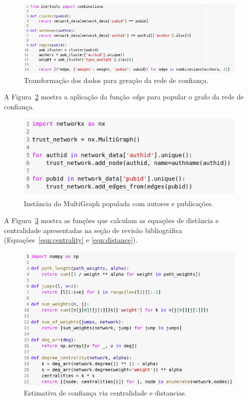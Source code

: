 \documentclass[12pt]{article}
\begin{document}
\begin{figure}[ht]
  \centering
  \includegraphics[width=1\textwidth]{trustest_code_a.png}
  \caption{Transformação dos dados para geração da rede de confiança.}
  \label{fig:trust-estimative-code-data-preparation}
\end{figure}

A Figura~\ref{fig:trust-estimative-code-multigraph} mostra a aplicação da função \textit{edge} para popular o grafo da rede de confiança.

\begin{figure}[ht]
  \centering
  \includegraphics[width=.8\textwidth]{trustest_code_b.png}
  \caption{Instância do MultiGraph populada com autores e publicações.}
  \label{fig:trust-estimative-code-multigraph}
\end{figure}

A Figura~\ref{fig:trust-estimative-code-centrality-distances} mostra as funções que calculam as equações de distância e centralidade apresentadas na seção de revisão bibliográfica (Equações~\ref{eqn:centrality} e \ref{eqn:distance}).

\begin{figure}[ht]
  \centering
  \includegraphics[width=.7\textwidth]{trustest_code_c.png}
  \caption{Estimativa de confiança via centralidade e distancias.}
  \label{fig:trust-estimative-code-centrality-distances}
\end{figure}
\end{document}
